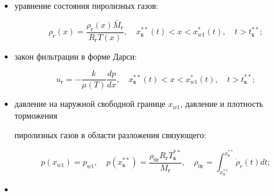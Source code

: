 \begin{itemize}
\begin{equation}
\end{equation}



\item

уравнение состояния пиролизных газов:

\begin{equation}

\label{kuzn11:eq18}

\rho_\text{г}  (x)=\frac{\rho_\text{г}  (x) \bar {M}_\text{г} }{R_\text{г}   T(x)},\quad x_\text{к}^{\ast \ast} (t)< x < x_{w1}^\ast

(t),\quad t>t_\text{к}^{\ast \ast};

\end{equation}



\item

закон фильтрации в форме Дарси:

\begin{equation}

\label{kuzn11:eq19}

u_\text{г}  =-\frac{k}{\mu (T)}\frac{d p }{dx}, \quad x_\text{к}^{\ast \ast}

(t)<x<x_{w1}^\ast (t),\quad t>t_\text{к}^{\ast \ast};

\end{equation}



\item давление на наружной свободной границе $x_{w1}$, давление и плотность торможения

пиролизных газов в области разложения связующего:

\begin{equation}

\label{kuzn11:eq20}

p(x_{w1})=p_{w1},

\quad

p(x_\text{к}^{\ast \ast})=\frac{\rho _\text{0г} R_\text{г}  T_\text{к}^{\ast \ast}}{M_\text{г} },

\quad

\rho_\text{0г} = \int_{x_\text{н}^{\ast \ast}}^{x_\text{к}^{\ast

\ast}} \dot {\rho}_r (t) dt;

\end{equation}



\item


\end{itemize}
